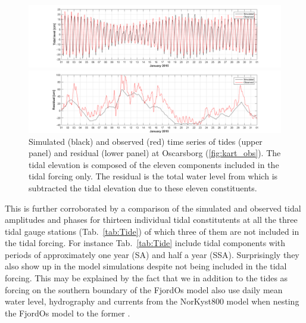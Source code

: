 \begin{figure}[hb] 
	\centerline{ \includegraphics*[trim=3cm 0cm 2.5cm 0cm,clip=true,width=\textwidth]{Figurer/Oscarsborg_Tide_selected_jan15} } 
	\centerline{ \includegraphics*[trim=3cm 0cm 2.5cm 0cm,clip=true,width=\textwidth]{Figurer/Oscarsborg_WL_rest_jan15} } 
 	\caption{\small Simulated (black) and observed (red) time series of tides (upper panel) and residual (lower panel) at Oscarsborg (\ref{fig:kart_obs}). The tidal elevation is composed of the eleven components included in the tidal forcing only. The residual is the total water level from which is subtracted the tidal elevation due to these eleven constituents.} 
	\label{fig:Waterlevel_jan15} 
\end{figure} 

This is further corroborated by a comparison of the simulated and observed tidal amplitudes and phases for thirteen individual tidal constitutents at all the three tidal gauge stations (Tab.~\ref{tab:Tide}) of which three of them are not included in the tidal forcing. For instance Tab.~\ref{tab:Tide} include tidal components with periods of approximately one year (SA) and half a year (SSA). Surprisingly they also show up in the model simulations despite not being included in the tidal forcing. This may be explained by the fact that we in addition to the tides as forcing on the southern boundary of the FjordOs model also use daily mean water level, hydrography and currents from the NorKyst800 model when nesting the FjordOs model to the former \citep{roed:etal:2016}. 

